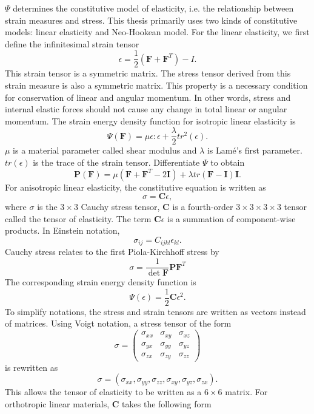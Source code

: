 $\Psi$ determines the constitutive model of elasticity, i.e. the relationship between strain measures and stress.
This thesis primarily uses two kinds of constitutive models: linear elasticity and Neo-Hookean model. For the linear elasticity, we first define the infinitesimal strain tensor
\[
\epsilon = \frac{1}{2}(\mathbf{F}+\mathbf{F}^T)-I.
\]
This strain tensor is a symmetric matrix. The stress tensor derived from this strain measure is also a symmetric matrix. This property is a necessary condition for conservation of linear and angular momentum. 
In other words, stress and internal elastic forces should not cause any change in total linear or angular momentum.
The strain energy density function for isotropic linear elasticity is
\[
\Psi(\mathbf{F}) = \mu\epsilon:\epsilon + \frac{\lambda}{2}tr^2(\epsilon).
\]
$\mu$ is a material parameter called shear modulus and $\lambda$ is Lam\'{e}'s first parameter.
$tr(\epsilon)$ is the trace of the strain tensor.
Differentiate $\Psi$ to obtain
\[
\mathbf{P}(\mathbf{F})=\mu(\mathbf{F}+\mathbf{F}^T-2\mathbf{I})+\lambda tr(\mathbf{F}-\mathbf{I})\mathbf{I}.
\]
For anisotropic linear elasticity, the constitutive equation is written as
\begin{equation}
\sigma=\mathbf{C}\epsilon,
\label{eq:constitutive}
\end{equation}
where $\sigma$ is the $3\times 3$ Cauchy stress tensor, $\mathbf{C}$ is a
fourth-order $3\times 3\times3\times3$ tensor called the tensor of elasticity.
The term $\mathbf{C}\epsilon$ is a summation of component-wise products.
In Einstein notation,
\[
\sigma_{ij}=C_{ijkl}\epsilon_{kl}.
\]
Cauchy stress relates to the first Piola-Kirchhoff stress by
\[
\sigma = \frac{1}{\det \mathbf{F}}\mathbf{P}\mathbf{F}^T
\]
The corresponding strain energy density function is
\[
\Psi(\epsilon)=\frac{1}{2}\mathbf{C}\epsilon^2.
\]
To simplify notations, the stress and strain tensors are written as vectors instead of matrices.
Using Voigt notation,
a stress tensor of the form
\[
\sigma=\begin{pmatrix}
\sigma_{xx} & \sigma_{xy} & \sigma_{xz}\\
\sigma_{yx} & \sigma_{yy} & \sigma_{yz}\\
\sigma_{zx} & \sigma_{zy} & \sigma_{zz}
\end{pmatrix}
\]
is rewritten as
\[\sigma=(\sigma_{xx} , \sigma_{yy} , \sigma_{zz},
\sigma_{xy} , \sigma_{yz} , \sigma_{zx}).
\]
This allows the tensor of elasticity to be written as a $6\times 6$ matrix.
For orthotropic linear materials, $\mathbf{C}$ takes the following form
